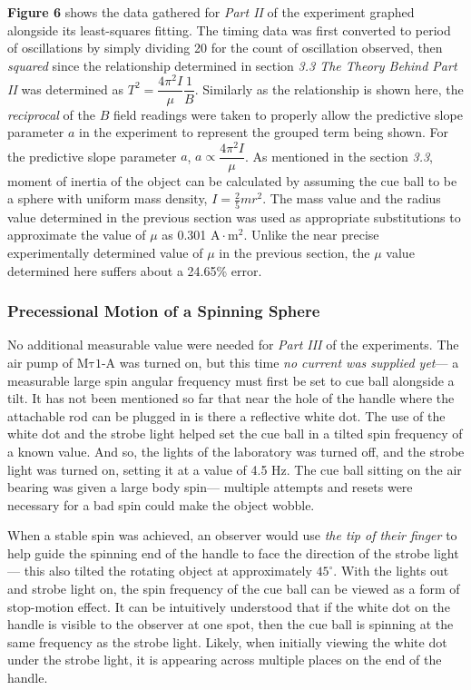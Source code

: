\documentclass[12pt]{article}
\newcommand{\mtauonea}{\mathrm{M\tau1}\text{-}\mathrm{A}}
\begin{document}
\begin{multicols}{2}
\textbf{Figure 6} shows the data gathered for \textit{Part II} of the experiment graphed alongside its least-squares fitting.
The timing data was first converted to period of oscillations by simply dividing 20 for the count of oscillation observed,
then \textit{squared} since the relationship determined in section \textit{3.3 The Theory Behind Part II}
was determined as $T^2=\dfrac{4\pi^2I}{\mu}\dfrac{1}{B}$.
Similarly as the relationship is shown here, the \textit{reciprocal} of the $B$ field readings
were taken to properly allow the predictive slope parameter $a$ in the experiment to represent the grouped term being shown.
For the predictive slope parameter $a$, $a\propto\dfrac{4\pi^2I}{\mu}$.
As mentioned in the section \textit{3.3}, moment of inertia of the object can be calculated
by assuming the cue ball to be a sphere with uniform mass density, $I=\frac{2}{5}mr^2$.
The mass value and the radius value determined in the previous section was used as appropriate substitutions
to approximate the value of $\mu$ as 0.301 $\mathrm{A\cdot m^2}$.
Unlike the near precise experimentally determined value of $\mu$ in the previous section,
the $\mu$ value determined here suffers about a 24.65\% error.

\subsubsection{Precessional Motion of a Spinning Sphere}
No additional measurable value were needed for \textit{Part III} of the experiments.
The air pump of $\mtauonea$ was turned on, but this time \textit{no current was supplied yet}---
a measurable large spin angular frequency must first be set to cue ball alongside a tilt.
It has not been mentioned so far that near the hole of the handle where the attachable rod can be plugged in
is there a reflective white dot.
The use of the white dot and the strobe light helped set the cue ball in a tilted spin frequency of a known value.
And so, the lights of the laboratory was turned off,
and the strobe light was turned on, setting it at a value of 4.5 Hz.
The cue ball sitting on the air bearing was given a large body spin---
multiple attempts and resets were necessary for a bad spin could make
the object wobble.

When a stable spin was achieved, an observer would use \textit{the tip of their finger}
to help guide the spinning end of the handle to face the direction of the strobe light---
this also tilted the rotating object at approximately $45^\circ$.
With the lights out and strobe light on, the spin frequency of the cue ball can be viewed
as a form of stop-motion effect.
It can be intuitively understood that if the white dot on the handle is visible to the observer at one spot,
then the cue ball is spinning at the same frequency as the strobe light.
Likely, when initially viewing the white dot under the strobe light,
it is appearing across multiple places on the end of the handle.


\end{multicols}
\end{document}
